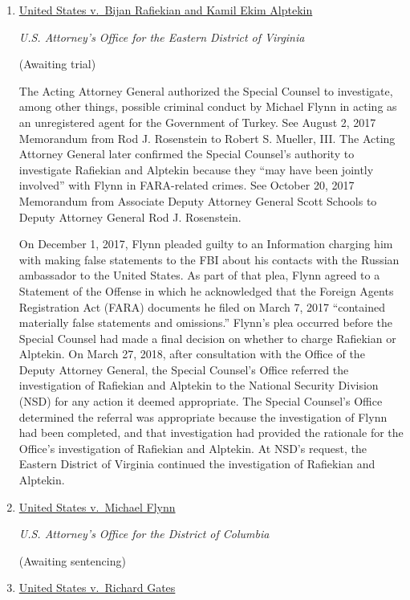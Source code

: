 \begin{enumerate}[1.]

\item \underline{United States v.\ Bijan Rafiekian and Kamil Ekim Alptekin}

\textit{U.S. Attorney’s Office for the Eastern District of Virginia}

(Awaiting trial)

The Acting Attorney General authorized the Special Counsel to investigate, among other things, possible criminal conduct by Michael Flynn in acting as an unregistered agent for the Government of Turkey.
See August 2, 2017 Memorandum from Rod J. Rosenstein to Robert S. Mueller, III\null.
The Acting Attorney General later confirmed the Special Counsel’s authority to investigate Rafiekian and Alptekin because they “may have been jointly involved” with Flynn in FARA-related crimes.
See October 20, 2017 Memorandum from Associate Deputy Attorney General Scott Schools to Deputy Attorney General Rod J. Rosenstein.

On December 1, 2017, Flynn pleaded guilty to an Information charging him with making false statements to the FBI about his contacts with the Russian ambassador to the United States.
As part of that plea, Flynn agreed to a Statement of the Offense in which he acknowledged that the Foreign Agents Registration Act (FARA) documents he filed on March 7, 2017 “contained materially false statements and omissions.”
Flynn’s plea occurred before the Special Counsel had made a final decision on whether to charge Rafiekian or Alptekin.
On March 27, 2018, after consultation with the Office of the Deputy Attorney General, the Special Counsel’s Office referred the investigation of Rafiekian and Alptekin to the National Security Division (NSD) for any action it deemed appropriate.
The Special Counsel’s Office determined the referral was appropriate because the investigation of Flynn had been completed, and that investigation had provided the rationale for the Office’s investigation of Rafiekian and Alptekin.
At NSD’s request, the Eastern District of Virginia continued the investigation of Rafiekian and Alptekin.

    \item \underline{United States v.\ Michael Flynn}

\textit{U.S. Attorney’s Office for the District of Columbia}

(Awaiting sentencing)

    \item \underline{United States v.\ Richard Gates}


\end{enumerate}
